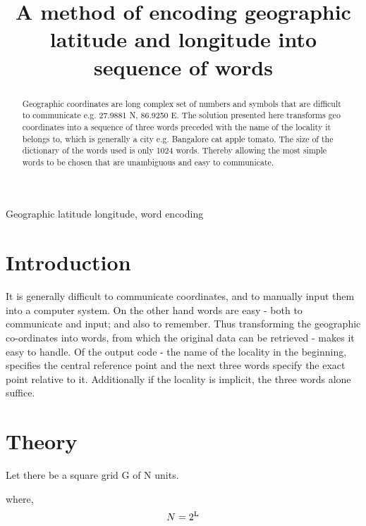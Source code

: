 \documentclass[conference]{IEEEtran}
\begin{document}
\title{A method of encoding geographic latitude and longitude into sequence of words}

\author{
}

\maketitle

\begin{abstract}
Geographic coordinates are long complex set of numbers and symbols that are difficult to communicate e.g. 27.9881 N, 86.9250 E. The solution presented here transforms geo coordinates into a sequence of three words preceded with the name of the locality it belongs to, which is generally a city e.g. Bangalore cat apple tomato. The size of the dictionary of the words used is only 1024 words. Thereby allowing the most simple words to be chosen that are unambiguous and easy to communicate.
\end{abstract}

\begin{IEEEkeywords}
Geographic latitude longitude, word encoding
\end{IEEEkeywords}

\section{Introduction}
It is generally difficult to communicate coordinates, and to manually input them into a computer system. On the other hand words are easy - both to communicate and input; and also to remember. Thus transforming the geographic co-ordinates into words, from which the original data can be retrieved - makes it easy to handle. Of the output code - the name of the locality in the beginning, specifies the central reference point and the next three words specify the exact point relative to it. Additionally if the locality is implicit, the three words alone suffice.
\section{Theory}
Let there be a square grid G of N units.

where, \begin{equation} N \label{eq:1} = 2\textsuperscript{L} \end{equation}
\end{document}

